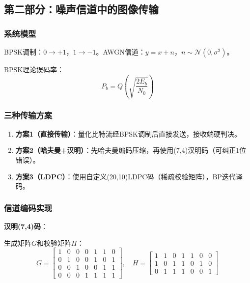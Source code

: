 \documentclass[12pt, a4paper]{article}
\begin{document}
\subsection{第二部分：噪声信道中的图像传输}

\subsubsection{系统模型}

BPSK调制：$0 \rightarrow +1$，$1 \rightarrow -1$。AWGN信道：$y = x + n$，$n \sim \mathcal{N}(0,\sigma^2)$。

BPSK理论误码率：
\begin{equation}
P_b = Q\left(\sqrt{\frac{2E_b}{N_0}}\right)
\label{eq:bpsk_ber}
\end{equation}

\subsubsection{三种传输方案}

\begin{enumerate}
    \item \textbf{方案1（直接传输）}：量化比特流经BPSK调制后直接发送，接收端硬判决。
    \item \textbf{方案2（哈夫曼+汉明）}：先哈夫曼编码压缩，再使用(7,4)汉明码（可纠正1位错误）。
    \item \textbf{方案3（LDPC）}：使用自定义(20,10)LDPC码（稀疏校验矩阵），BP迭代译码。
\end{enumerate}

\subsubsection{信道编码实现}

\textbf{汉明(7,4)码}：

生成矩阵$G$和校验矩阵$H$：
\begin{equation}
G = \begin{bmatrix}
1&0&0&0&1&1&0\\
0&1&0&0&1&0&1\\
0&0&1&0&0&1&1\\
0&0&0&1&1&1&1
\end{bmatrix},\quad
H = \begin{bmatrix}
1&1&0&1&1&0&0\\
1&0&1&1&0&1&0\\
0&1&1&1&0&0&1
\end{bmatrix}
\label{eq:hamming}
\end{equation}
\end{document}
